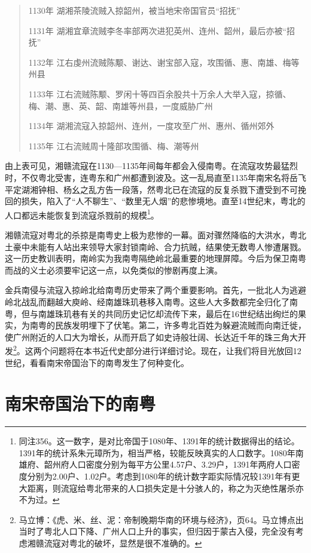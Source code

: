 \begin{quote}

1130年 湖湘茶陵流贼入掠韶州，被当地宋帝国官员“招抚”

1131年 湖湘宜章流贼李冬率部两次进犯英州、连州、韶州，最后亦被“招抚”

1132年 江右虔州流贼陈颙、谢达、谢宝部入寇，攻围循、惠、南雄、梅等州县

1133年 江右流贼陈颙、罗闲十等四百余股共十万余人大举入寇，掠循、梅、潮、惠、英、韶、南雄等州县，一度威胁广州

1134年 湖湘流寇入掠韶州、连州，一度攻至广州、惠州、循州郊外

1135年 江右流贼周十隆部攻围循、梅、潮等州

\end{quote}

由上表可见，湘赣流寇在1130—1135年间每年都会入侵南粤。在流寇攻势最猛烈时，不仅粤北受害，连粤东和广州都遭到波及。这一乱局直至1135年南宋名将岳飞平定湖湘钟相、杨幺之乱方告一段落，然粤北已在流寇的反复杀戮下遭受到不可挽回的损失，陷入了“人不聊生”、“数里无人烟”的悲惨境地。直至14世纪末，粤北的人口都远未能恢复到流寇杀戮前的规模\footnote{同注356。这一数字，是对比帝国于1080年、1391年的统计数据得出的结论。1391年的统计系朱元璋所为，相当严格，较能反映真实的人口数字。1080年南雄府、韶州府人口密度分别为每平方公里4.57户、3.29户，1391年两府人口密度分别为2.00户、1.02户。考虑到1080年的统计数字距实际情况较1391年有更大距离，则流寇给粤北带来的人口损失定是十分骇人的，称之为灭绝性屠杀亦不为过。}。

湘赣流寇对粤北的杀掠是南粤史上极为悲惨的一幕。面对骤然降临的大洪水，粤北土豪中未能有人站出来领导大家封锁南岭、合力抗贼，结果使无数粤人惨遭屠戮。这一历史教训表明，南岭实为我南粤隔绝岭北最重要的地理屏障。今后为保卫南粤而战的义士必须要牢记这一点，以免类似的惨剧再度上演。

金兵南侵与流寇入掠岭北给南粤历史带来了两个重要影响。首先，一批北人为逃避岭北战乱而翻越大庾岭、经南雄珠玑巷移入南粤。这些人大多数都完全归化了南粤，但与南雄珠玑巷有关的共同历史记忆却流传下来，最后在16世纪结出绚烂的果实，为南粤的民族发明埋下了伏笔。第二，许多粤北百姓为躲避流贼而向南迁徙，使广州附近的人口大为增长，从而开启了如史诗般壮阔、长达近千年的珠三角大开发\footnote{马立博：《虎、米、丝、泥：帝制晚期华南的环境与经济》，页64。马立博点出当时了粤北人口下降、广州人口上升的事实，但归因于蒙古入侵，完全没有考虑湘赣流寇对粤北的破坏，显然是很不准确的。}。这两个问题将在本书近代史部分进行详细讨论。现在，让我们将目光放回12世纪，看看南宋帝国治下的南粤发生了何种变化。

\section{南宋帝国治下的南粤}

